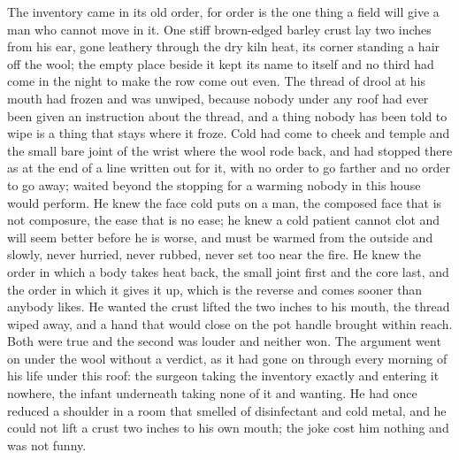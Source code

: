 The inventory came in its old order, for order is the one thing a field will give a man who cannot move in it. One stiff brown-edged barley crust lay two inches from his ear, gone leathery through the dry kiln heat, its corner standing a hair off the wool; the empty place beside it kept its name to itself and no third had come in the night to make the row come out even. The thread of drool at his mouth had frozen and was unwiped, because nobody under any roof had ever been given an instruction about the thread, and a thing nobody has been told to wipe is a thing that stays where it froze. Cold had come to cheek and temple and the small bare joint of the wrist where the wool rode back, and had stopped there as at the end of a line written out for it, with no order to go farther and no order to go away;  waited beyond the stopping for a warming nobody in this house would perform. He knew the face cold puts on a man, the composed face that is not composure, the ease that is no ease; he knew a cold patient cannot clot and will seem better before he is worse, and must be warmed from the outside and slowly, never hurried, never rubbed, never set too near the fire. He knew the order in which a body takes heat back, the small joint first and the core last, and the order in which it gives it up, which is the reverse and comes sooner than anybody likes. He wanted the crust lifted the two inches to his mouth, the thread wiped away, and a hand that would close on the pot handle brought within reach. Both were true and the second was louder and neither won. The argument went on under the wool without a verdict, as it had gone on through every morning of his life under this roof: the surgeon taking the inventory exactly and entering it nowhere, the infant underneath taking none of it and wanting. He had once reduced a shoulder in a room that smelled of disinfectant and cold metal, and he could not lift a crust two inches to his own mouth; the joke cost him nothing and was not funny.

